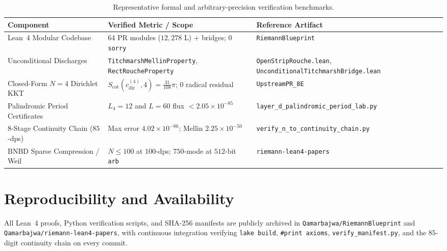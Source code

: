 \documentclass[11pt,a4paper]{article}
\theoremstyle{definition}
\begin{document}
\begin{table}[htbp]
\centering
\caption{Representative formal and arbitrary-precision verification benchmarks.}
\label{tab:jar_benchmarks}
\footnotesize
\begin{tabular}{@{}p{4.3cm}p{5.9cm}p{4.6cm}@{}}
\toprule
Component & Verified Metric / Scope & Reference Artifact \\
\midrule
Lean~4 Modular Codebase & $64$ PR modules ($12{,}278$ L) + bridges; $0$ \texttt{sorry} & \texttt{RiemannBlueprint} \\
Unconditional Discharges & \texttt{Titchmarsh\allowbreak MellinProperty}, \texttt{RectRouche\allowbreak Property} & \texttt{OpenStripRouche.lean}, \texttt{Unconditional\allowbreak TitchmarshBridge.lean} \\
Closed-Form $N=4$ Dirichlet KKT & $S_{\mathrm{cot}}(c_{\mathrm{dir}}^{(4)}, 4) = \frac{31}{108}\pi$; $0$ radical residual & \texttt{UpstreamPR\_8E} \\
Palindromic Period Certificates & $L_4 = 12$ and $L = 60$ flux $< 2.05 \times 10^{-85}$ & \texttt{layer\_d\_\allowbreak palindromic\_\allowbreak period\_\allowbreak lab.py} \\
8-Stage Continuity Chain ($85$-dps) & Max error $4.02 \times 10^{-86}$; Mellin $2.25 \times 10^{-50}$ & \texttt{verify\_n\_to\_\allowbreak continuity\_\allowbreak chain.py} \\
BNBD Sparse Compression / Weil & $N \le 100$ at $100$-dps; $750$-mode at $512$-bit \texttt{arb} & \texttt{riemann-lean4-papers} \\
\bottomrule
\end{tabular}
\end{table}

\section{Reproducibility and Availability}

All Lean~4 proofs, Python verification scripts, and SHA-256 manifests are publicly archived in \texttt{Qamarbajwa/RiemannBlueprint} and \texttt{Qamarbajwa/riemann-lean4-papers}, with continuous integration verifying \texttt{lake build}, \texttt{\#print axioms}, \texttt{verify\_manifest.py}, and the $85$-digit continuity chain on every commit.
\end{document}
